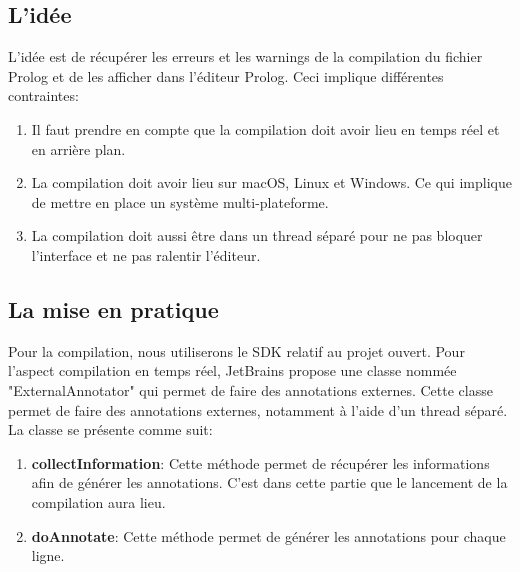 \subsection{L'idée}
\noindent L'idée est de récupérer les erreurs et les warnings de la compilation du fichier Prolog et de les afficher dans l'éditeur Prolog.
\newdoubleline
Ceci implique différentes contraintes:
\begin{enumerate}
    \item Il faut prendre en compte que la compilation doit avoir lieu en temps réel et en arrière plan.
    \item La compilation doit avoir lieu sur macOS, Linux et Windows.
    Ce qui implique de mettre en place un système multi-plateforme.
    \item La compilation doit aussi être dans un thread séparé pour ne pas bloquer l'interface et ne pas ralentir l'éditeur.
\end{enumerate}

\subsection{La mise en pratique}
\noindent Pour la compilation, nous utiliserons le SDK relatif au projet ouvert.
\newdoubleline
Pour l'aspect compilation en temps réel, JetBrains propose une classe nommée "ExternalAnnotator" qui permet de faire des annotations externes.
\newdoubleline
Cette classe permet de faire des annotations externes, notamment à l'aide d'un thread séparé. La classe se présente comme suit:
\begin{enumerate}
    \item \textbf{collectInformation}: Cette méthode permet de récupérer les informations afin de générer les annotations.
    C'est dans cette partie que le lancement de la compilation aura lieu.
    \item \textbf{doAnnotate}: Cette méthode permet de générer les annotations pour chaque ligne.
\end{enumerate}

